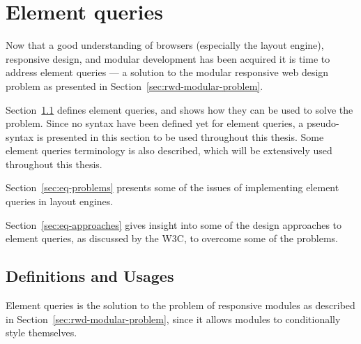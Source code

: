 \documentclass[a4paper,11pt]{kth-mag}
\begin{document}
  \chapter{Element queries}\label{chp:eq}
    Now that a good understanding of \glspl{browser} (especially the \gls{layout engine}), \gls{responsive} design, and modular development has been acquired it is time to address element queries --- a solution to the modular \gls{responsive} \gls{web} design problem as presented in Section~\ref{sec:rwd-modular-problem}.
    
    Section~\ref{sec:eq-definitions} defines element queries, and shows how they can be used to solve the problem.
    Since no syntax have been defined yet for element queries, a pseudo-syntax is presented in this section to be used throughout this thesis.
    Some element queries terminology is also described, which will be extensively used throughout this thesis.

    Section~\ref{sec:eq-problems} presents some of the issues of implementing element queries  in layout engines.
    
    Section~\ref{sec:eq-approaches} gives insight into some of the design approaches to element queries, as discussed by the W3C, to overcome some of the problems.

    \section{Definitions and Usages}\label{sec:eq-definitions}
      \noindent
      Element queries is the solution to the problem of responsive modules as described in Section~\ref{sec:rwd-modular-problem}, since it allows modules to conditionally style themselves.
\end{document}
